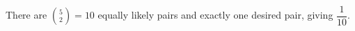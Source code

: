 There are $\binom52=10$ equally likely pairs and exactly one desired pair, giving $\boxed{\dfrac{1}{10}}$.

